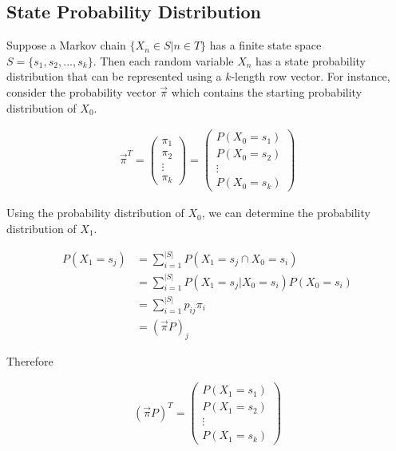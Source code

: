 \documentclass[a4paper,12pt]{article}
\theoremstyle{definition}
\begin{document}
\subsection{State Probability Distribution}

Suppose a Markov chain $\{X_n \in S|n \in T\}$ has a finite state space $S = \{s_1, s_2,..., s_k\}$. Then each random 
variable $X_n$ has a state probability distribution that can be represented using a $k$-length row vector. For instance, 
consider the probability vector $\vec{\pi}$ which contains the starting probability distribution of $X_0$.
	
	\begin{equation*}
	\begin{aligned}
		\vec{\pi}^T = \begin{pmatrix}
		 \pi_1 \\
		 \pi_2 \\ 
		 \vdots \\
		 \pi_k
		 \end{pmatrix} = \begin{pmatrix}
		 P(X_0 = s_1) \\
		 P(X_0 = s_2) \\ 
		 \vdots \\
		 P(X_0 = s_k)
		 \end{pmatrix}
	\end{aligned}
	\end{equation*}		
	
Using the probability distribution of $X_0$, we can determine the probability distribution of $X_1$.

	\begin{equation*}
	\begin{aligned}
		P(X_1 = s_j) &= \sum_{i=1}^{|S|} P(X_1 = s_j \cap X_0 = s_i) \\
				 	 &= \sum_{i=1}^{|S|} P(X_1 = s_j | X_0 = s_i)P(X_0 = s_i) \\
			     	 &= \sum_{i=1}^{|S|} p_{ij}\pi_i \\
			     	 &= (\vec{\pi}P)_j
	\end{aligned}
	\end{equation*}	
			     	 
	Therefore
	
	\begin{equation*}
	\begin{aligned}
		 (\vec{\pi}P)^T =
		 \begin{pmatrix}
		 P(X_1 = s_1) \\
		 P(X_1 = s_2) \\ 
		 \vdots \\
		 P(X_1 = s_k)
		 \end{pmatrix}
	\end{aligned}
	\end{equation*}
	
\end{document}
